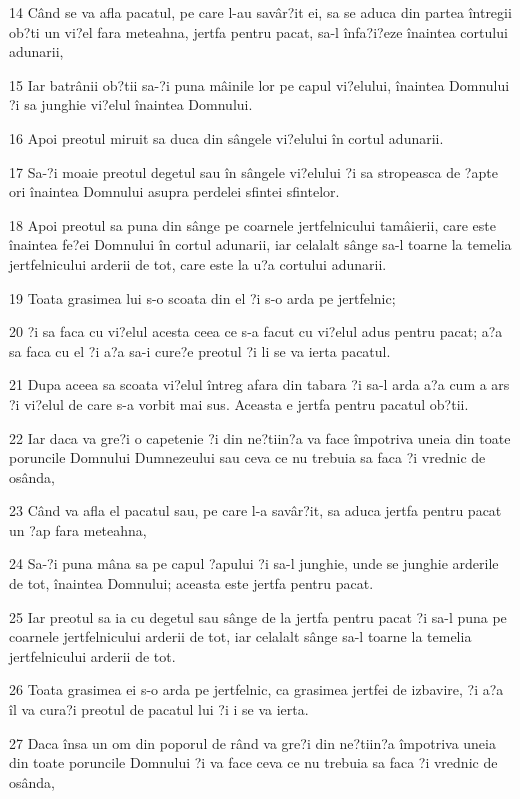 \par 14 Când se va afla pacatul, pe care l-au savâr?it ei, sa se aduca din partea întregii ob?ti un vi?el fara meteahna, jertfa pentru pacat, sa-l înfa?i?eze înaintea cortului adunarii,
\par 15 Iar batrânii ob?tii sa-?i puna mâinile lor pe capul vi?elului, înaintea Domnului ?i sa junghie vi?elul înaintea Domnului.
\par 16 Apoi preotul miruit sa duca din sângele vi?elului în cortul adunarii.
\par 17 Sa-?i moaie preotul degetul sau în sângele vi?elului ?i sa stropeasca de ?apte ori înaintea Domnului asupra perdelei sfintei sfintelor.
\par 18 Apoi preotul sa puna din sânge pe coarnele jertfelnicului tamâierii, care este înaintea fe?ei Domnului în cortul adunarii, iar celalalt sânge sa-l toarne la temelia jertfelnicului arderii de tot, care este la u?a cortului adunarii.
\par 19 Toata grasimea lui s-o scoata din el ?i s-o arda pe jertfelnic;
\par 20 ?i sa faca cu vi?elul acesta ceea ce s-a facut cu vi?elul adus pentru pacat; a?a sa faca cu el ?i a?a sa-i cure?e preotul ?i li se va ierta pacatul.
\par 21 Dupa aceea sa scoata vi?elul întreg afara din tabara ?i sa-l arda a?a cum a ars ?i vi?elul de care s-a vorbit mai sus. Aceasta e jertfa pentru pacatul ob?tii.
\par 22 Iar daca va gre?i o capetenie ?i din ne?tiin?a va face împotriva uneia din toate poruncile Domnului Dumnezeului sau ceva ce nu trebuia sa faca ?i vrednic de osânda,
\par 23 Când va afla el pacatul sau, pe care l-a savâr?it, sa aduca jertfa pentru pacat un ?ap fara meteahna,
\par 24 Sa-?i puna mâna sa pe capul ?apului ?i sa-l junghie, unde se junghie arderile de tot, înaintea Domnului; aceasta este jertfa pentru pacat.
\par 25 Iar preotul sa ia cu degetul sau sânge de la jertfa pentru pacat ?i sa-l puna pe coarnele jertfelnicului arderii de tot, iar celalalt sânge sa-l toarne la temelia jertfelnicului arderii de tot.
\par 26 Toata grasimea ei s-o arda pe jertfelnic, ca grasimea jertfei de izbavire, ?i a?a îl va cura?i preotul de pacatul lui ?i i se va ierta.
\par 27 Daca însa un om din poporul de rând va gre?i din ne?tiin?a împotriva uneia din toate poruncile Domnului ?i va face ceva ce nu trebuia sa faca ?i vrednic de osânda,
